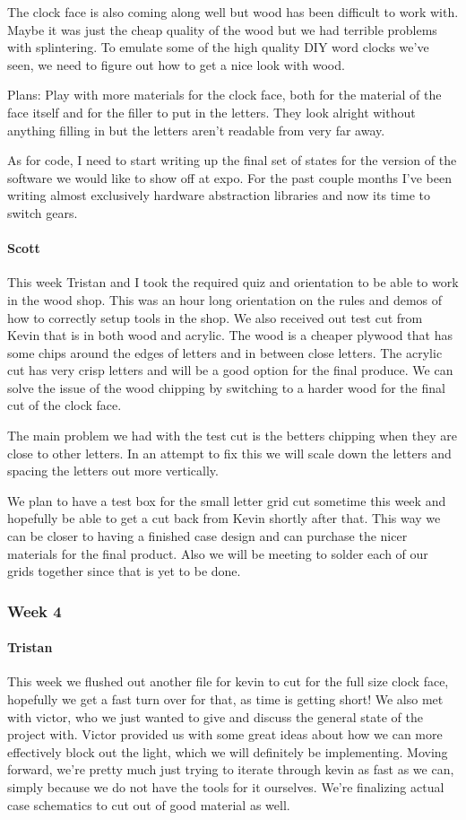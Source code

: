 \documentclass[onecolumn, draftclsnofoot,10pt, compsoc]{IEEEtran}
\begin{document}
The clock face is also coming along well but wood has been difficult to work with. Maybe it was just the cheap quality of the wood but we had terrible problems with splintering. To emulate some of the high quality DIY word clocks we've seen, we need to figure out how to get a nice look with wood.

Plans: Play with more materials for the clock face, both for the material of the face itself and for the filler to put in the letters. They look alright without anything filling in but the letters aren't readable from very far away.

As for code, I need to start writing up the final set of states for the version of the software we would like to show off at expo. For the past couple months I've been writing almost exclusively hardware abstraction libraries and now its time to switch gears.
\paragraph{Scott}
This week Tristan and I took the required quiz and orientation to be able to work in the wood shop. This was an hour long orientation on the rules and demos of how to correctly setup tools in the shop. We also received out test cut from Kevin that is in both wood and acrylic. The wood is a cheaper plywood that has some chips around the edges of letters and in between close letters. The acrylic cut has very crisp letters and will be a good option for the final produce. We can solve the issue of the wood chipping by switching to a harder wood for the final cut of the clock face.

The main problem we had with the test cut is the betters chipping when they are close to other letters. In an attempt to fix this we will scale down the letters and spacing the letters out more vertically.

We plan to have a test box for the small letter grid cut sometime this week and hopefully be able to get a cut back from Kevin shortly after that. This way we can be closer to having a finished case design and can purchase the nicer materials for the final product. Also we will be meeting to solder each of our grids together since that is yet to be done.
\subsubsection{Week 4}
\paragraph{Tristan}
This week we flushed out another file for kevin to cut for the full size clock face, hopefully we get a fast turn over for that, as time is getting short! We also met with victor, who we just wanted to give and discuss the general state of the project with. Victor provided us with some great ideas about how we can more effectively block out the light, which we will definitely be implementing. Moving forward, we're pretty much just trying to iterate through kevin as fast as we can, simply because we do not have the tools for it ourselves. We're finalizing actual case schematics to cut out of good material as well.
\end{document}
